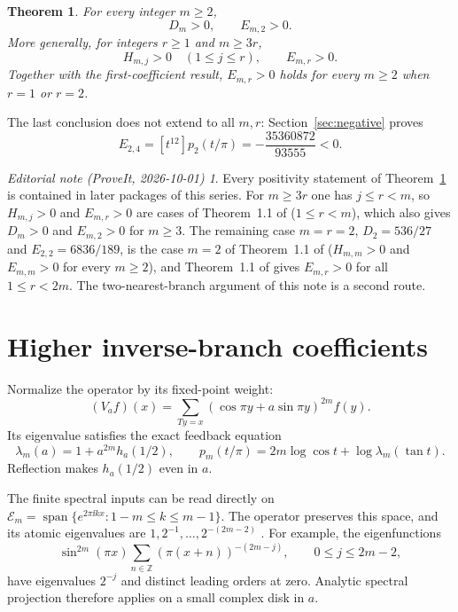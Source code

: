 \documentclass[11pt,a4paper]{article}
\newtheorem{theorem}{Theorem}[section]
\theoremstyle{remark}\newtheorem*{ednote}{Editorial note (ProveIt, 2026-10-01)}
\newcommand{\Z}{\mathbb Z}\newcommand{\E}{\mathcal E}
\begin{document}
\begin{theorem}\label{thm:main}
For every integer $m\ge2$,
\[
 D_m>0,\qquad E_{m,2}>0.
\]
More generally, for integers $r\ge1$ and $m\ge3r$,
\[
 H_{m,j}>0\quad(1\le j\le r),\qquad E_{m,r}>0.
\]
Together with the first-coefficient result, $E_{m,r}>0$ holds for every $m\ge2$ when $r=1$ or $r=2$.
\end{theorem}
The last conclusion does not extend to all $m,r$: Section~\ref{sec:negative} proves
\[
 E_{2,4}=[t^{12}]p_2(t/\pi)=-\frac{35360872}{93555}<0.
\]
\begin{ednote}
Every positivity statement of Theorem~\ref{thm:main} is contained in later packages of this
series. For $m\ge3r$ one has $j\le r<m$, so $H_{m,j}>0$ and $E_{m,r}>0$ are cases of
Theorem~1.1 of  ($1\le r<m$), which also gives $D_m>0$ and
$E_{m,2}>0$ for $m\ge3$. The remaining case $m=r=2$, $D_2=536/27$ and $E_{2,2}=6836/189$, is
the case $m=2$ of Theorem~1.1 of  ($H_{m,m}>0$ and
$E_{m,m}>0$ for every $m\ge2$), and Theorem~1.1 of  gives
$E_{m,r}>0$ for all $1\le r<2m$. The two-nearest-branch argument of this note is a second
route.
\end{ednote}

\section{Higher inverse-branch coefficients}
Normalize the operator by its fixed-point weight:
\[
 (V_af)(x)=\sum_{Ty=x}(\cos\pi y+a\sin\pi y)^{2m}f(y).
\]
Its eigenvalue satisfies the exact feedback equation
\begin{equation}\label{eq:feedback}
 \lambda_m(a)=1+a^{2m}h_a(1/2),\qquad
 p_m(t/\pi)=2m\log\cos t+\log\lambda_m(\tan t).
\end{equation}
Reflection makes $h_a(1/2)$ even in $a$.

The finite spectral inputs can be read directly on
$\E_m=\operatorname{span}\{e^{2\pi\ii kx}:1-m\le k\le m-1\}$.
The operator preserves this space, and its atomic eigenvalues are
$1,2^{-1},\ldots,2^{-(2m-2)}$ \cite{integer,first}. For example, the eigenfunctions
\[
 \sin^{2m}(\pi x)\sum_{n\in\Z}(\pi(x+n))^{-(2m-j)},
 \qquad 0\le j\le2m-2,
\]
have eigenvalues $2^{-j}$ and distinct leading orders at zero. Analytic spectral projection therefore applies on a small complex disk in $a$.
\end{document}
